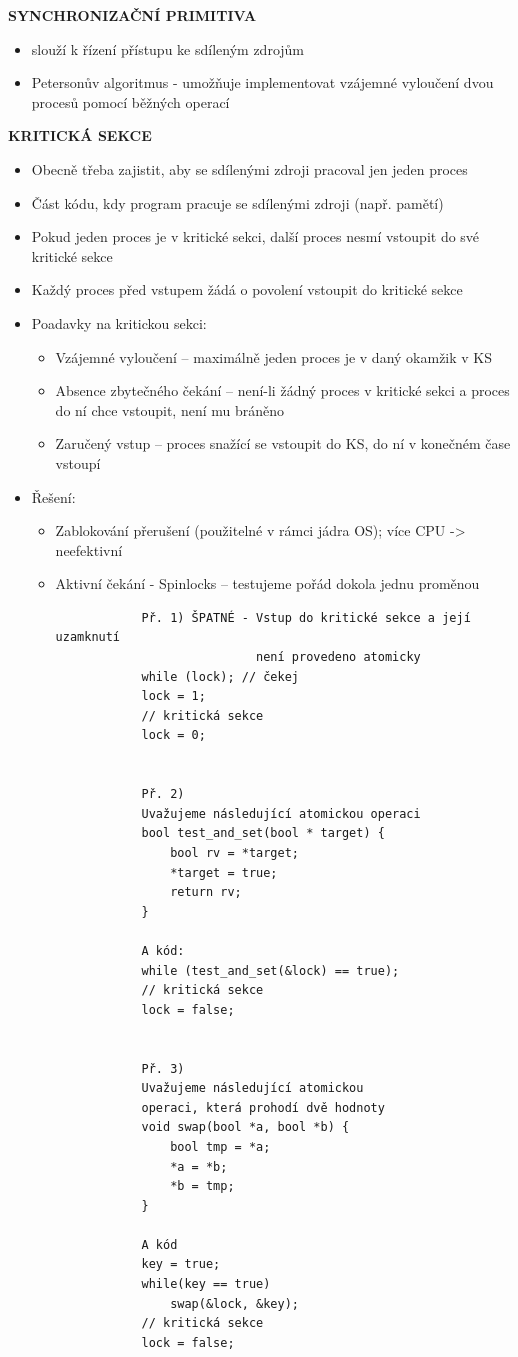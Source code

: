 \documentclass[10pt,a4paper]{article}
\begin{document}
\textbf{SYNCHRONIZAČNÍ PRIMITIVA}
\begin{itemize}
	\item slouží k řízení přístupu ke sdíleným zdrojům
	\item Petersonův algoritmus - umožňuje implementovat vzájemné vyloučení dvou procesů pomocí běžných operací
\end{itemize}

\textbf{KRITICKÁ SEKCE}
\begin{itemize}
	\item Obecně třeba zajistit, aby se sdílenými zdroji pracoval jen jeden proces
	\item Část kódu, kdy program pracuje se sdílenými zdroji (např. pamětí)
	\item Pokud jeden proces je v kritické sekci, další proces nesmí vstoupit do své kritické sekce
	\item Každý proces před vstupem žádá o povolení vstoupit do kritické sekce
	\item Poadavky na kritickou sekci:
	\begin{itemize}
		\item Vzájemné vyloučení – maximálně jeden proces je v daný okamžik v KS
		\item Absence zbytečného čekání – není-li žádný proces v kritické sekci a proces do ní chce vstoupit, není mu bráněno
		\item Zaručený vstup – proces snažící se vstoupit do KS, do ní v konečném čase vstoupí
	\end{itemize}
	\item Řešení:
	\begin{itemize}
		\item Zablokování přerušení (použitelné v rámci jádra OS); více CPU -> neefektivní
		\item Aktivní čekání - Spinlocks – testujeme pořád dokola jednu proměnou
		\begin{verbatim}
			Př. 1) ŠPATNÉ - Vstup do kritické sekce a její uzamknutí
			                není provedeno atomicky
			while (lock); // čekej
			lock = 1;
			// kritická sekce
			lock = 0;


			Př. 2)
			Uvažujeme následující atomickou operaci
			bool test_and_set(bool * target) {
				bool rv = *target;
				*target = true;
				return rv;
			}

			A kód:
			while (test_and_set(&lock) == true);
			// kritická sekce
			lock = false;


			Př. 3)
			Uvažujeme následující atomickou
			operaci, která prohodí dvě hodnoty
			void swap(bool *a, bool *b) {
				bool tmp = *a;
				*a = *b;
				*b = tmp;
			}

			A kód
			key = true;
			while(key == true)
				swap(&lock, &key);
			// kritická sekce
			lock = false;
		\end{verbatim}
	\end{itemize}
\end{itemize}
\end{document}
